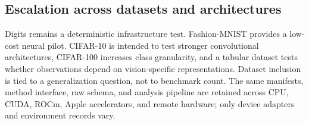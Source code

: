 \subsection{Escalation across datasets and architectures}
Digits remains a deterministic infrastructure test.  Fashion-MNIST provides a low-cost
neural pilot.  CIFAR-10 is intended to test stronger convolutional architectures,
CIFAR-100 increases class granularity, and a tabular dataset tests whether observations
depend on vision-specific representations.  Dataset inclusion is tied to a generalization
question, not to benchmark count.  The same manifests, method interface, raw schema, and
analysis pipeline are retained across CPU, CUDA, ROCm, Apple accelerators, and remote
hardware; only device adapters and environment records vary.
